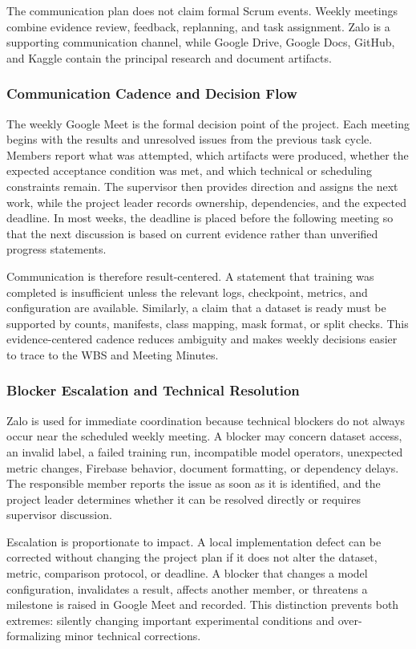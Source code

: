 \documentclass[12pt,a4paper]{report}
\begin{document}
\endgroup
The communication plan does not claim formal Scrum events. Weekly meetings combine evidence review, feedback, replanning, and task assignment. Zalo is a supporting communication channel, while Google Drive, Google Docs, GitHub, and Kaggle contain the principal research and document artifacts.\par
\subsubsection{Communication Cadence and Decision Flow}
The weekly Google Meet is the formal decision point of the project. Each meeting begins with the results and unresolved issues from the previous task cycle. Members report what was attempted, which artifacts were produced, whether the expected acceptance condition was met, and which technical or scheduling constraints remain. The supervisor then provides direction and assigns the next work, while the project leader records ownership, dependencies, and the expected deadline. In most weeks, the deadline is placed before the following meeting so that the next discussion is based on current evidence rather than unverified progress statements.\par
Communication is therefore result-centered. A statement that training was completed is insufficient unless the relevant logs, checkpoint, metrics, and configuration are available. Similarly, a claim that a dataset is ready must be supported by counts, manifests, class mapping, mask format, or split checks. This evidence-centered cadence reduces ambiguity and makes weekly decisions easier to trace to the WBS and Meeting Minutes.\par
\subsubsection{Blocker Escalation and Technical Resolution}
Zalo is used for immediate coordination because technical blockers do not always occur near the scheduled weekly meeting. A blocker may concern dataset access, an invalid label, a failed training run, incompatible model operators, unexpected metric changes, Firebase behavior, document formatting, or dependency delays. The responsible member reports the issue as soon as it is identified, and the project leader determines whether it can be resolved directly or requires supervisor discussion.\par
Escalation is proportionate to impact. A local implementation defect can be corrected without changing the project plan if it does not alter the dataset, metric, comparison protocol, or deadline. A blocker that changes a model configuration, invalidates a result, affects another member, or threatens a milestone is raised in Google Meet and recorded. This distinction prevents both extremes: silently changing important experimental conditions and over-formalizing minor technical corrections.\par
\end{document}
